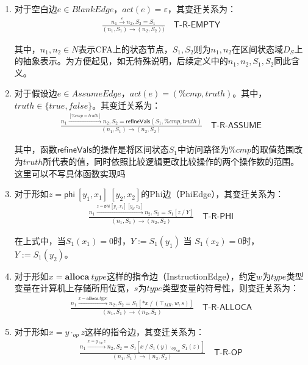 \begin{enumerate}[（1）]

\item 对于空白边$ e \in BlankEdge $，$ act(e) = \varepsilon $，其变迁关系为：
\begin{align}
	\frac{n_1 \xrightarrow{\varepsilon} n_2, S_2 = S_1}{(n_1, S_1) \to (n_2, S_2))}
	\quad\textsf{T-R-EMPTY}
\end{align}

其中，$ n_1, n_2 \in N $表示CFA上的状态节点，$ S_1, S_2 $则为$ n_1, n_2 $在区间状态域$ D_S $上的抽象表示。为方便起见，如无特殊说明，后续定义中的$ n_1, n_2, S_1, S_2 $同此含义。

\item 对于假设边$ e \in AssumeEdge $，$ act(e) = (\%cmp, truth) $。其中，$ truth \in \{true, false\} $。其变迁关系为：
\begin{align}
	\frac{n_1 \xrightarrow{[\%cmp = truth]} n_2, 
		S_2 = \mathsf{refineVals}(S_1, \%cmp, truth)}
	{(n_1, S_1) \to (n_2, S_2)}
	\quad\textsf{T-R-ASSUME}
\end{align}

其中，函数$ \mathsf{refineVals} $的操作是将区间状态$ S_1 $中访问路径为$ \%cmp $的取值范围改为$ truth $所代表的值，同时依照比较逻辑更改比较操作的两个操作数的范围。{\color{red}这里可以不写具体函数实现吗}

\item 对于形如$ z = \mathsf{phi}~[y_1, x_1]~[y_2, x_2] $的Phi边（PhiEdge），其变迁关系为：
\begin{align}
\frac{n_1 \xrightarrow{z = \mathsf{phi}~[y_1, x_1]~[y_2, x_2] } n_2, 
	S_2 = S_1[z ~/~ Y ]}
{(n_1, S_1) \to (n_2, S_2)}
\quad\textsf{T-R-PHI}
\end{align}

在上式中，当$ S_1(x_1) = 0 $时，$ Y := 	S_1(y_1) $ 当 $ S_1(x_2) = 0 $时，$ Y :=  S_1(y_2) $。

\item 对于形如$ x = \mathbf{alloca}  ~type $这样的指令边（InstructionEdge），约定$ w $为$ type $类型变量在计算机上存储所用位宽，$ s $为$ type $类型变量的符号性，则变迁关系为：
\begin{align}
	\frac{n_1 \xrightarrow{x = \mathbf{alloca}  ~type} n_2, 
		S_2 = S_1[*x ~/~ (\top_{MR}, w, s) ]}
	{(n_1, S_1) \to (n_2, S_2)}
	\quad\textsf{T-R-ALLOCA}
\end{align}

\item 对于形如$ x = y \cdot_{op} z $这样的指令边，其变迁关系为：
\begin{align}
	\frac{n_1 \xrightarrow{x = y \cdot_{op} z} n_2, 
		S_2 = S_1[x ~/~ S_1(y) \cdot_{op_{SR}} S_1(z) ]}
	{(n_1, S_1) \to (n_2, S_2)}
	\quad\textsf{T-R-OP}
\end{align}


\end{enumerate}
